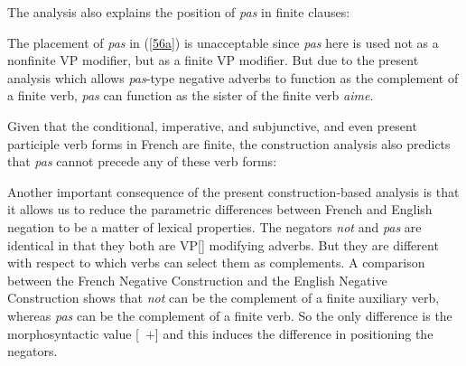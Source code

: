 \documentclass[output=paper]{langsci/langscibook}
\begin{document}
{\begin{exe}
\begin{xlist}
\begin{exe}
\begin{xlist}
The analysis also explains the position of \emph{pas} in
finite clauses:

\eal
{} \label{56a}
\zl

\noindent
The placement of \emph{pas} in (\ref{56a}) is unacceptable since
\emph{pas} here is used not as a nonfinite VP modifier, but as
a finite VP modifier. But due to the
present analysis which allows {\it pas}-type negative adverbs
to function as the complement of a finite verb,
\emph{pas} can function as
the sister of the finite verb
\emph{aime}.

Given that the conditional, imperative, and subjunctive,
and even present participle verb forms in French are finite, the
construction
analysis also predicts that \emph{pas} cannot precede any of these verb
forms:


\eal
{}
\zl

\eal
{}
\zl

\eal
{}
\zl

\eal
{}
\zl


Another important consequence of the present construction-based analysis
is that it allows us to reduce the parametric differences between
French and English negation to be a matter of lexical properties.
The negators \emph{not} and \emph{pas} are identical in that they both are
VP[] modifying adverbs. But they are different with respect to
which verbs can select them as complements.
A comparison between the French Negative Construction and
the English  Negative Construction shows that \emph{not} can be the
complement of a finite auxiliary verb, whereas \emph{pas} can be the
complement of a finite verb.  So the only difference
is the morphosyntactic value [\AUX\ $+$] and this induces
the difference in positioning the negators.


\end{xlist}
\end{exe}
\end{xlist}
\end{exe}}
\end{document}
